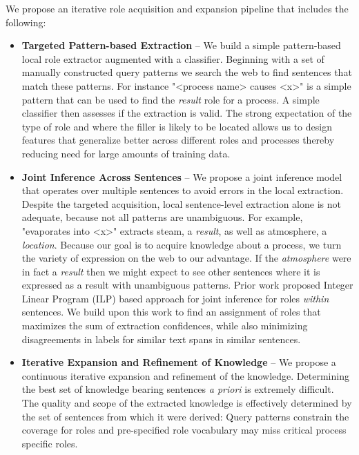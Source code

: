 We propose an iterative role acquisition and expansion pipeline that includes the following:
\begin{itemize}
\item {\bf Targeted Pattern-based Extraction} --  We build a simple pattern-based local role extractor augmented with a classifier.
Beginning with a set of manually constructed query patterns we search the web to find sentences that match these patterns.
For instance "<process name> causes <x>" is a simple pattern that can be used to find the {\em result} role for a process. 
A simple classifier then assesses if the extraction is valid.
The strong expectation of the type of role and where the filler is likely to be located allows us to design features
that generalize better across different roles and processes thereby reducing need for large amounts of training data.

\item {\bf Joint Inference Across Sentences} --  We propose a joint inference model that operates over multiple sentences to avoid errors in the local extraction.
Despite the targeted acquisition, local sentence-level extraction alone is not adequate, because not all patterns are unambiguous. 
For example, "evaporates into <x>" extracts steam, a {\em result}, as well as atmosphere, a {\em location}. 
Because our goal is to acquire knowledge about a process, we turn the variety of expression on the web to our advantage. 
If the {\em atmosphere} were in fact a {\em result} then we might expect to see other sentences
where it is expressed as a result with unambiguous patterns.
Prior work proposed Integer Linear Program (ILP) based approach for joint inference for roles {\em within} sentences.
We build upon this work to find an assignment of roles that maximizes the sum of extraction confidences, 
while also minimizing disagreements in labels for similar text spans in similar sentences.

\item {\bf Iterative Expansion and Refinement of Knowledge} -- We propose a continuous iterative expansion and refinement of the knowledge.
Determining the best set of knowledge bearing sentences {\em a priori} is extremely difficult. 
The quality and scope of the extracted knowledge is effectively determined by the set of sentences from which it were derived:
Query patterns constrain the coverage for roles and pre-specified role vocabulary may miss critical process specific roles.


\end{itemize}
